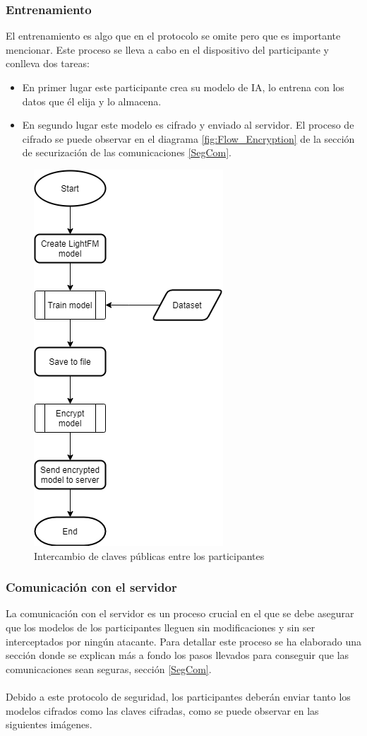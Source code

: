 \subsubsection{Entrenamiento}
El entrenamiento es algo que en el protocolo se omite pero que es importante mencionar. Este proceso se lleva a cabo en el dispositivo del participante y conlleva dos tareas:
\begin{itemize}
    \item En primer lugar este participante crea su modelo de IA, lo entrena con los datos que él elija y lo almacena.
    \item En segundo lugar este modelo es cifrado y enviado al servidor. El proceso de cifrado se puede observar en el diagrama \ref{fig:Flow_Encryption} de la sección de securización de las comunicaciones \ref{SegCom}.
\end{itemize} 
\begin{figure}[H]
    \centering
    \includegraphics[height=0.6\textheight]{Figuras/flowchart_train.png}    
    \caption{Intercambio de claves públicas entre los participantes} 
    \label{fig:Entrenamiento}
\end{figure}

\subsubsection{Comunicación con el servidor}
La comunicación con el servidor es un proceso crucial en el que se debe asegurar que los modelos de los participantes lleguen sin modificaciones y sin ser interceptados por ningún atacante. Para detallar este proceso se ha elaborado una sección donde se explican más a fondo los pasos llevados para conseguir que las comunicaciones sean seguras, sección \ref{SegCom}.
\\ \\
Debido a este protocolo de seguridad, los participantes deberán enviar tanto los modelos cifrados como las claves cifradas, como se puede observar en las siguientes imágenes.

